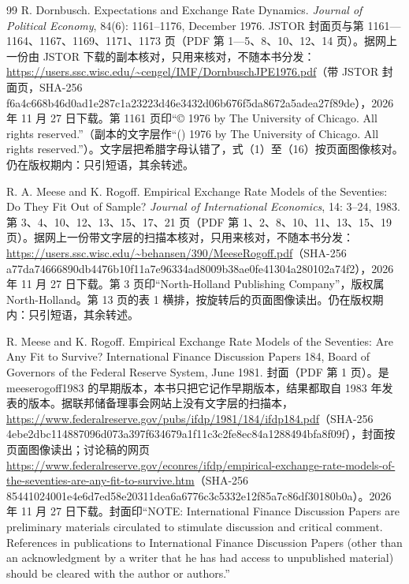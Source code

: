 \begin{thebibliography}{99}
 R. Dornbusch. Expectations and Exchange Rate Dynamics. \emph{Journal of Political Economy}, 84(6): 1161--1176, December 1976. JSTOR 封面页与第 1161—1164、1167、1169、1171、1173 页（PDF 第 1—5、8、10、12、14 页）。据网上一份由 JSTOR 下载的副本核对，只用来核对，不随本书分发：\url{https://users.ssc.wisc.edu/~cengel/IMF/DornbuschJPE1976.pdf}（带 JSTOR 封面页，SHA-256 f6a4c668b46d0ad1e287c1a23223d46e3432d06b676f5da8672a5adea27f89de），2026 年 11 月 27 日下载。第 1161 页印“© 1976 by The University of Chicago. All rights reserved.”（副本的文字层作“() 1976 by The University of Chicago. All rights reserved.”）。文字层把希腊字母认错了，式（1）至（16）按页面图像核对。仍在版权期内：只引短语，其余转述。

 R. A. Meese and K. Rogoff. Empirical Exchange Rate Models of the Seventies: Do They Fit Out of Sample? \emph{Journal of International Economics}, 14: 3--24, 1983. 第 3、4、10、12、13、15、17、21 页（PDF 第 1、2、8、10、11、13、15、19 页）。据网上一份带文字层的扫描本核对，只用来核对，不随本书分发：\url{https://users.ssc.wisc.edu/~behansen/390/MeeseRogoff.pdf}（SHA-256 a77da74666890db4476b10f11a7e96334ad8009b38ae0fe41304a280102a74f2），2026 年 11 月 27 日下载。第 3 页印“North-Holland Publishing Company”，版权属 North-Holland。第 13 页的表 1 横排，按旋转后的页面图像读出。仍在版权期内：只引短语，其余转述。

 R. Meese and K. Rogoff. Empirical Exchange Rate Models of the Seventies: Are Any Fit to Survive? International Finance Discussion Papers 184, Board of Governors of the Federal Reserve System, June 1981. 封面（PDF 第 1 页）。是 meeserogoff1983 的早期版本，本书只把它记作早期版本，结果都取自 1983 年发表的版本。据联邦储备理事会网站上没有文字层的扫描本，\url{https://www.federalreserve.gov/pubs/ifdp/1981/184/ifdp184.pdf}（SHA-256 4ebe2dbc114887096d073a397f634679a1f11c3c2fe8ec84a1288494bfa8f09f），封面按页面图像读出；讨论稿的网页 \url{https://www.federalreserve.gov/econres/ifdp/empirical-exchange-rate-models-of-the-seventies-are-any-fit-to-survive.htm}（SHA-256 85441024001e4e6d7ed58e20311dea6a6776c3c5332e12f85a7c86df30180b0a）。2026 年 11 月 27 日下载。封面印“NOTE: International Finance Discussion Papers are preliminary materials circulated to stimulate discussion and critical comment. References in publications to International Finance Discussion Papers (other than an acknowledgment by a writer that he has had access to unpublished material) should be cleared with the author or authors.”


\end{thebibliography}
